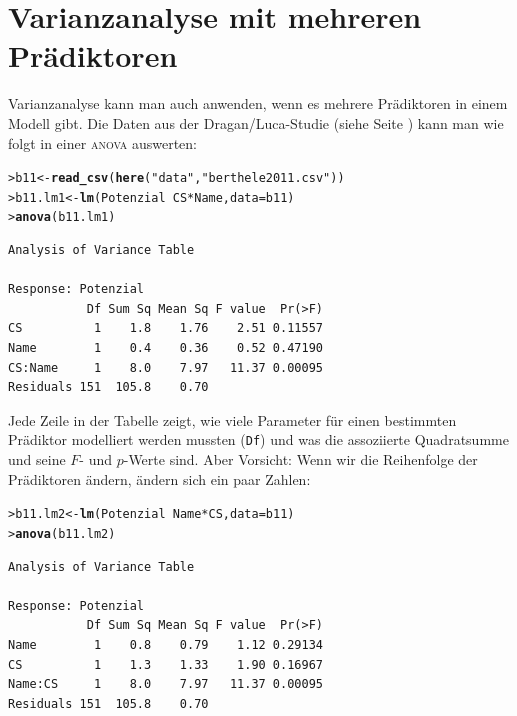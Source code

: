 \documentclass[oneside, 10pt]{book}\usepackage[]{graphicx}\usepackage[]{xcolor}
\makeatletter
\newcommand{\hlstr}[1]{\textcolor[rgb]{0.192,0.494,0.8}{#1}}%
\newcommand{\hlopt}[1]{\textcolor[rgb]{0,0,0}{#1}}%
\newcommand{\hlstd}[1]{\textcolor[rgb]{0.345,0.345,0.345}{#1}}%
\newcommand{\hlkwb}[1]{\textcolor[rgb]{0.69,0.353,0.396}{#1}}%
\newcommand{\hlkwc}[1]{\textcolor[rgb]{0.333,0.667,0.333}{#1}}%
\newcommand{\hlkwd}[1]{\textcolor[rgb]{0.737,0.353,0.396}{\textbf{#1}}}%
\newenvironment{kframe}{%
 \def\at@end@of@kframe{}%
 \ifinner\ifhmode%
  \def\at@end@of@kframe{\end{minipage}}%
  \begin{minipage}{\columnwidth}%
 \fi\fi%
 \def\FrameCommand##1{\hskip\@totalleftmargin \hskip-\fboxsep
 \colorbox{shadecolor}{##1}\hskip-\fboxsep
     \hskip-\linewidth \hskip-\@totalleftmargin \hskip\columnwidth}%
 \MakeFramed {\advance\hsize-\width
   \@totalleftmargin\z@ \linewidth\hsize
   \@setminipage}}%
 {\par\unskip\endMakeFramed%
 \at@end@of@kframe}
\newenvironment{knitrout}{}{} %
\makeatother
\begin{document}
\section{Varianzanalyse mit mehreren Prädiktoren}
Varianzanalyse kann man auch anwenden, wenn
es mehrere Prädiktoren in einem Modell gibt.
Die Daten aus der Dragan/Luca-Studie (siehe Seite \pageref{sec:berthele2011b}) kann
man wie folgt in einer \textsc{anova} auswerten:
\begin{knitrout}
\color{fgcolor}\begin{kframe}
\begin{alltt}
\hlstd{> }\hlstd{b11} \hlkwb{<-} \hlkwd{read_csv}\hlstd{(}\hlkwd{here}\hlstd{(}\hlstr{"data"}\hlstd{,} \hlstr{"berthele2011.csv"}\hlstd{))}
\hlstd{> }\hlstd{b11.lm1} \hlkwb{<-} \hlkwd{lm}\hlstd{(Potenzial} \hlopt{~} \hlstd{CS} \hlopt{*} \hlstd{Name,} \hlkwc{data} \hlstd{= b11)}
\hlstd{> }\hlkwd{anova}\hlstd{(b11.lm1)}
\end{alltt}
\begin{verbatim}
Analysis of Variance Table

Response: Potenzial
           Df Sum Sq Mean Sq F value  Pr(>F)
CS          1    1.8    1.76    2.51 0.11557
Name        1    0.4    0.36    0.52 0.47190
CS:Name     1    8.0    7.97   11.37 0.00095
Residuals 151  105.8    0.70                
\end{verbatim}
\end{kframe}
\end{knitrout}

Jede Zeile in der Tabelle zeigt, wie
viele Parameter für einen bestimmten Prädiktor
modelliert werden mussten (\texttt{Df})
und was die assoziierte Quadratsumme
und seine $F$- und $p$-Werte sind.
Aber Vorsicht: Wenn wir die Reihenfolge
der Prädiktoren ändern, ändern sich ein paar
Zahlen:
\begin{knitrout}
\color{fgcolor}\begin{kframe}
\begin{alltt}
\hlstd{> }\hlstd{b11.lm2} \hlkwb{<-} \hlkwd{lm}\hlstd{(Potenzial} \hlopt{~} \hlstd{Name} \hlopt{*} \hlstd{CS,} \hlkwc{data} \hlstd{= b11)}
\hlstd{> }\hlkwd{anova}\hlstd{(b11.lm2)}
\end{alltt}
\begin{verbatim}
Analysis of Variance Table

Response: Potenzial
           Df Sum Sq Mean Sq F value  Pr(>F)
Name        1    0.8    0.79    1.12 0.29134
CS          1    1.3    1.33    1.90 0.16967
Name:CS     1    8.0    7.97   11.37 0.00095
Residuals 151  105.8    0.70                
\end{verbatim}
\end{kframe}
\end{knitrout}
\end{document}
